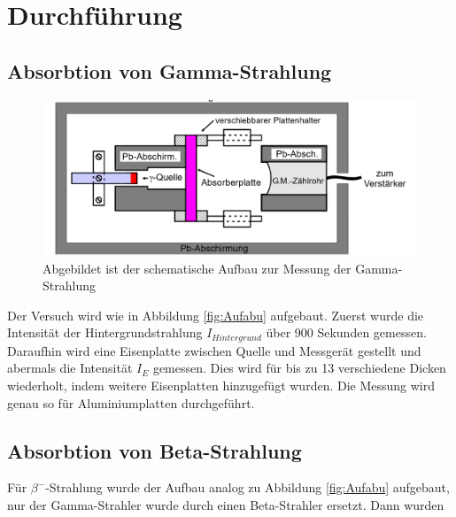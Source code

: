 \section{Durchführung}
\label{sec:Durchführung}

\subsection{Absorbtion von Gamma-Strahlung}
\begin{figure}
\includegraphics[width=\textwidth]{Bilder/Aufbau.png}
\caption{Abgebildet ist der schematische Aufbau zur Messung der Gamma-Strahlung}
\label{fig:Aufbau}
\end{figure}

Der Versuch wird wie in Abbildung \ref{fig:Aufabu} aufgebaut.
Zuerst wurde die Intensität der Hintergrundstrahlung $I_{Hintergrund}$ über 900 Sekunden gemessen. 
Daraufhin wird eine Eisenplatte zwischen Quelle und Messgerät gestellt und abermals die Intensität $I_E$ gemessen.
Dies wird für bis zu 13 verschiedene Dicken wiederholt, indem weitere Eisenplatten hinzugefügt wurden.
Die Messung wird genau so für Aluminiumplatten durchgeführt. 

\subsection{Absorbtion von Beta-Strahlung}
Für $\beta^{-}$-Strahlung wurde der Aufbau analog zu Abbildung \ref{fig:Aufabu} aufgebaut, nur der Gamma-Strahler wurde durch einen Beta-Strahler ersetzt.
Dann wurden
